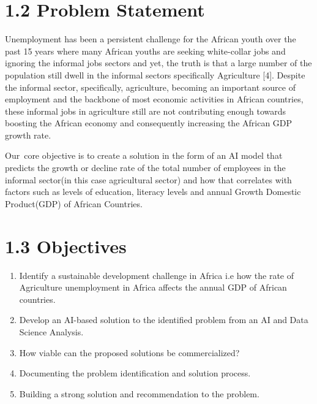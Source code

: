 \documentclass[12pt]{article}
\renewcommand{\_}{\kern-1.5pt\textunderscore\kern-1.5pt}
\begin{document}
\chapter{1.2 Problem Statement}
\begin{justify}
{\fontsize{9pt}{10.8pt}\selectfont Unemployment has been a persistent challenge for the African youth over the past 15 years where many African youths are seeking white-collar jobs and ignoring the informal jobs sectors and yet, the truth is that a large number of the population still dwell in the informal sectors specifically Agriculture [4]. Despite the informal sector, specifically, agriculture, becoming an important source of employment and the backbone of most economic activities in African countries, these informal jobs in agriculture still are not contributing enough towards boosting the African economy and consequently increasing the African GDP growth rate.\par}
\end{justify}
\begin{justify}
{\fontsize{9pt}{10.8pt}\selectfont Our\ core objective is to create a solution in the form of an AI model that predicts the growth or decline rate of the total number of employees in the informal sector(in this case agricultural sector) and how that correlates with factors such as levels of education, literacy levels and annual Growth Domestic Product(GDP) of African Countries.  \par}
\end{justify}

\vspace{\baselineskip}
\chapter{1.3 Objectives}
\begin{enumerate}
	\item {\fontsize{9pt}{10.8pt}\selectfont Identify a sustainable development challenge in Africa i.e how the rate of Agriculture unemployment in Africa affects the annual GDP of African countries.\par}
	\item {\fontsize{9pt}{10.8pt}\selectfont Develop an AI-based solution to the identified problem from an AI and Data Science Analysis.}
	\item {\fontsize{9pt}{10.8pt}\selectfont How viable can the proposed solutions be commercialized?}
	\item {\fontsize{9pt}{10.8pt}\selectfont Documenting the problem identification and solution process.}
	\item {\fontsize{9pt}{10.8pt}\selectfont Building a strong solution and recommendation to the problem.}
\end{enumerate}
\end{document}
